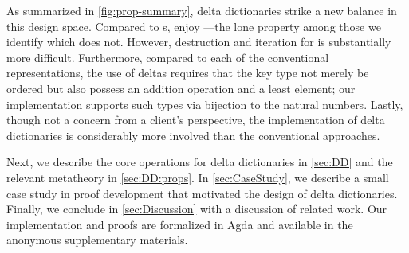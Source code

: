 As summarized in \autoref{fig:prop-summary}, delta dictionaries strike a new balance in this design space.
%
Compared to \cal{}s, \dds{} enjoy \SemTot{}---the lone property among those we identify which \cal{} does not.
%
However, destruction and iteration for \dds{} is substantially more difficult.
%
%
Furthermore, compared to each of the conventional representations, the use of deltas requires that the key type not merely be ordered but also possess an addition operation and a least element;
%
our implementation supports such types via bijection to the natural numbers.
%
%
Lastly, though not a concern from a client's perspective, the implementation of delta dictionaries is considerably more involved than the conventional approaches.





%
Next, we describe the core operations for delta dictionaries in \autoref{sec:DD} and the relevant metatheory in \autoref{sec:DD:props}.
%
In \autoref{sec:CaseStudy}, we describe a small case study in proof development that motivated the design of delta dictionaries.
%
Finally, we conclude in \autoref{sec:Discussion} with a discussion of related work.
%
Our implementation and proofs are formalized in Agda and available in the anonymous supplementary materials.


